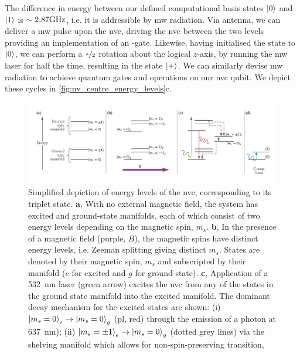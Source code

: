 The difference in energy between our defined computational basis states $\ket{0}$ and $\ket{1}$ is 
    $\sim 2.87 \textrm{GHz}$, i.e. it is addressible by \gls{mw} radiation.
Via antenna, we can deliver a \gls{mw} pulse upon the \gls{nvc}, driving the \gls{nvc} between the two levels
    providing an implementation of an -gate. 
Likewise, having initialised the state to $\ket{0}$, we can perform a $\nicefrac{\pi}{2}$ rotation 
    about the logical $z$-axis, by running the \gls{mw} laser for half the time, 
    resulting in the state $\ket{+}$. 
We can similarly devise \gls{mw} radiation to achieve quantum gates and operations on our \gls{nvc} qubit.
We depict these cycles in \cref{fig:nv_centre_energy_levels}c. 
\par

\begin{figure}[t]
    \begin{center}
        \includegraphics[width=0.95\linewidth]{experimental_study/figures/nv_centre_cartoon.pdf}
    \end{center}
    \caption[ energy levels]{
        Simplified depiction of energy levels of the \acrlong{nvc}, corresponding to its triplet state. 
        \textbf{a}, With no external magnetic field, the system has excited and ground-state manifolds, 
            each of which consist of two energy levels depending on the magnetic spin, $m_s$.
        \textbf{b}, In the presence of a magnetic field (purple, $B$), the magnetic spins have distinct energy levels, 
            i.e. Zeeman splitting giving distinct $m_s$. 
        States are denoted by their magnetic spin, $m_s$ and subscripted by their manifold ($e$ for excited and $g$ for ground-state). 
        \textbf{c},  Application of a \SI{532}{\nano\metre} laser (green arrow) excites the \acrlong{nvc} from any of the states in the 
            ground state manifold into the excited manifold. 
        The dominant decay mechanism for the excited states are shown: 
            (i) $\ket{m_s=0}_e \rightarrow \ket{m_s=0}_g$ (\acrlong{pl}, red) through the emission of a photon at \SI{637}{\nano\metre});
            (ii) $\ket{m_s=\pm 1}_e \rightarrow \ket{m_s=0}_g$ (dotted grey lines) via the shelving manifold which allows for non-spin-preserving transition, 
}
\end{figure}
